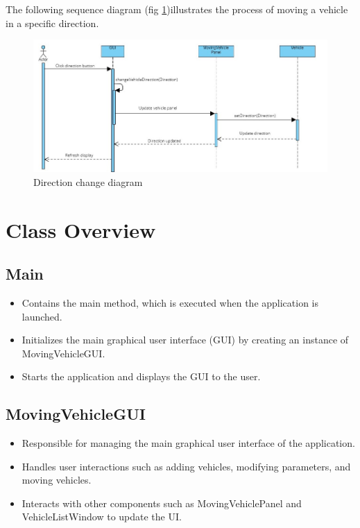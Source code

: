 \documentclass{article}
\begin{document}
The following sequence diagram (fig \ref{fig:direction_change_diagram})illustrates the process of moving a vehicle in a specific direction.

\begin{figure}[h]
    \centering
    \includegraphics[width=1\textwidth]{images/Direction change diagram.jpg}
    \caption{Direction change diagram}
    \label{fig:direction_change_diagram}
\end{figure}

\section{Class Overview}

\subsection{Main}

\begin{itemize}
    \item Contains the main method, which is executed when the application is launched.
    \item Initializes the main graphical user interface (GUI) by creating an instance of MovingVehicleGUI.
    \item Starts the application and displays the GUI to the user.
\end{itemize}





\subsection{MovingVehicleGUI}

\begin{itemize}
    \item Responsible for managing the main graphical user interface of the application.
    \item Handles user interactions such as adding vehicles, modifying parameters, and moving vehicles.
    \item Interacts with other components such as MovingVehiclePanel and VehicleListWindow to update the UI.
\end{itemize}
\end{document}
